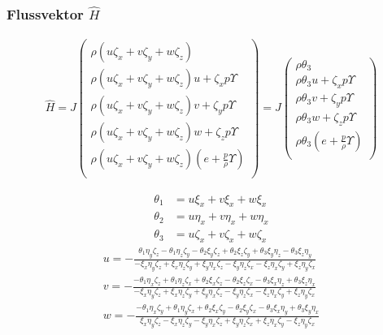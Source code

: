 \subsubsection{Flussvektor $\hat{H}$}
\begin{align*}
\hat{H}
=
J
\begin{pmatrix}
\rho \left(u \zeta_x+v \zeta_y +w \zeta_z\right)
\\
\rho \left(u \zeta_x+v \zeta_y +w \zeta_z\right) u +\zeta_x p \Upsilon
\\
\rho \left(u \zeta_x+v \zeta_y +w \zeta_z\right) v +\zeta_y p \Upsilon
\\
\rho \left(u \zeta_x+v \zeta_y +w \zeta_z\right) w +\zeta_z p \Upsilon
\\
\rho \left(u \zeta_x+v \zeta_y +w \zeta_z\right) \left( e+\frac{p}{\rho} \Upsilon\right)
\\
\end{pmatrix}
=
J
\begin{pmatrix}
\rho \theta_3
\\
\rho \theta_3 u +\zeta_x p \Upsilon
\\
\rho \theta_3 v +\zeta_y p \Upsilon
\\
\rho \theta_3 w +\zeta_z p \Upsilon
\\
\rho \theta_3 \left( e+\frac{p}{\rho} \Upsilon\right)
\\
\end{pmatrix}
\end{align*}

\begin{align*}
\theta_1&=u \xi_x+v \xi_x+w \xi_x\\
\theta_2&=u \eta_x+v \eta_x+w \eta_x\\
\theta_3&=u \zeta_x+v \zeta_x+w \zeta_x
\end{align*}
\begin{align*}
u = -\frac{\theta_1 \eta_y \zeta_z-\theta_1 \eta_z \zeta_y-\theta_2 \xi_y \zeta_z+\theta_2 \xi_z \zeta_y+\theta_3 \xi_y \eta_z-\theta_3 \xi_z \eta_y}{-\xi_x \eta_y \zeta_z+\xi_x \eta_z \zeta_y+\xi_y \eta_x \zeta_z-\xi_y \eta_z \zeta_x-\xi_z \eta_x \zeta_y+\xi_z \eta_y \zeta_x}\\
v = -\frac{-\theta_1 \eta_x \zeta_z+\theta_1 \eta_z \zeta_x+\theta_2 \xi_x \zeta_z-\theta_2 \xi_z \zeta_x-\theta_3 \xi_x \eta_z+\theta_3 \xi_z \eta_x}{-\xi_x \eta_y \zeta_z+\xi_x \eta_z \zeta_y+\xi_y \eta_x \zeta_z-\xi_y \eta_z \zeta_x-\xi_z \eta_x \zeta_y+\xi_z \eta_y \zeta_x}\\ 
w = -\frac{-\theta_1 \eta_x \zeta_y+\theta_1 \eta_y \zeta_x+\theta_2 \xi_x \zeta_y-\theta_2 \xi_y \zeta_x-\theta_3 \xi_x \eta_y+\theta_3 \xi_y \eta_x}{\xi_x \eta_y \zeta_z-\xi_x \eta_z \zeta_y-\xi_y \eta_x \zeta_z+\xi_y \eta_z \zeta_x+\xi_z \eta_x \zeta_y-\xi_z \eta_y \zeta_x}
\end{align*}

